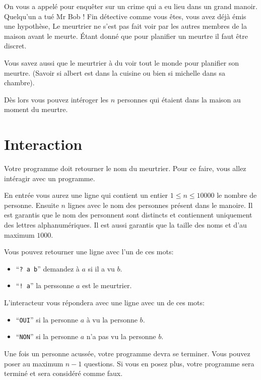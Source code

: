 \problemname{\problemyamlname}


\newcommand{\maxn}{10e4}  %

On vous a appelé pour enquêter sur un crime qui a eu lieu dans un grand manoir. Quelqu'un a tué Mr Bob ! Fin détective comme vous êtes, vous avez déjà émis une hypothèse,
Le meurtrier ne s'est pas fait voir par les autres membres de la maison avant le meurte. Étant donné que pour planifier un meurtre il faut être discret.

Vous savez aussi que le meurtrier à du voir tout le monde pour planifier son meurtre. (Savoir si albert est dans la cuisine ou bien si michelle dans sa chambre).

Dès lors vous pouvez intéroger les $n$ personnes qui étaient dans la maison au moment du meurtre. 


\section*{Interaction}
Votre programme doit retourner le nom du meurtrier. Pour ce faire, vous allez intéragir avec un programme.

En entrée vous aurez une ligne qui contient un entier $1 \le n \le 10000$ le nombre de personne.
Ensuite $n$ lignes avec le nom des personnes présent dans le manoire. Il est garantis que le nom des personnent sont distincts et contiennent uniquement des lettres alphanumériques.
Il est aussi garantis que la taille des noms et d'au maximum $1000$.

Vous pouvez retourner une ligne avec l'un de ces mots:

\begin{itemize}
    \item ``\texttt{? a b}'' demandez à $a$ si il a vu $b$.
    \item ``\texttt{! a}'' la perssonne $a$ est le meurtrier.
\end{itemize}

L'interacteur vous répondera avec une ligne avec un de ces mots:
\begin{itemize}
    \item ``\texttt{OUI}'' si la personne $a$ à vu la personne $b$.
    \item ``\texttt{NON}'' si la personne $a$ n'a pas vu la personne $b$.
\end{itemize}

Une fois un personne acussée, votre programme devra se terminer.
Vous pouvez poser au maximum $n - 1$ questions. Si vous en posez plus, votre programme sera terminé et sera considéré comme faux. 
